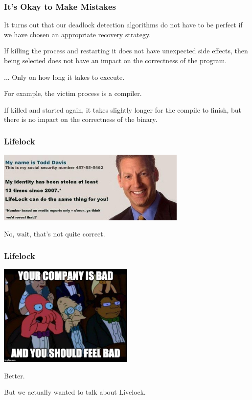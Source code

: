 \begin{frame}
	\frametitle{It's Okay to Make Mistakes}

	It turns out that our deadlock detection algorithms do not have to be perfect if we have chosen an appropriate recovery strategy.

	If killing the process and restarting it does not have unexpected side effects, then being selected does not have an impact on the correctness of the program.

	... Only on how long it takes to execute.

	For example, the victim process is a compiler.

	If killed and started again, it takes slightly longer for the compile to finish, but there is no impact on the correctness of the binary.

\end{frame}


\begin{frame}
\frametitle{Lifelock}

\begin{center}
	\includegraphics[width=0.7\textwidth]{images/lifelock.jpg}
\end{center}

No, wait, that's not quite correct.

\end{frame}


\begin{frame}
\frametitle{Lifelock}

\begin{center}
	\includegraphics[width=0.5\textwidth]{images/zoidberg2.jpg}
\end{center}

Better.

But we actually wanted to talk about Livelock.

\end{frame}


